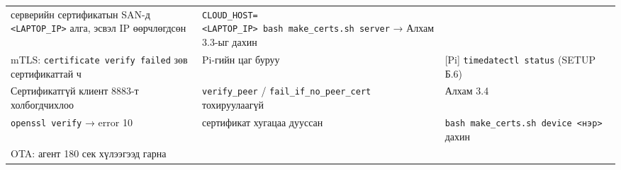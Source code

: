 \begin{longtable}[]{@{}lll@{}}
\begin{minipage}[t]{0.30\columnwidth}
серверийн сертификатын SAN-д \texttt{\textless{}LAPTOP\_\allowbreak{}IP\textgreater{}} алга, эсвэл IP өөрчлөгдсөн\strut
\end{minipage} & \begin{minipage}[t]{0.30\columnwidth}\raggedright
\texttt{CLOUD\_\allowbreak{}HOST=\allowbreak{}\textless{}LAPTOP\_\allowbreak{}IP\textgreater{}\ bash\ make\_\allowbreak{}certs.\allowbreak{}sh\ server} → Алхам 3.3-ыг дахин\strut
\end{minipage}\tabularnewline
\begin{minipage}[t]{0.30\columnwidth}\raggedright
mTLS: \texttt{certificate\ verify\ failed} зөв сертификаттай ч\strut
\end{minipage} & \begin{minipage}[t]{0.30\columnwidth}\raggedright
Pi-гийн цаг буруу\strut
\end{minipage} & \begin{minipage}[t]{0.30\columnwidth}\raggedright
{[}Pi{]} \texttt{timedatectl\ status} (SETUP Б.6)\strut
\end{minipage}\tabularnewline
\begin{minipage}[t]{0.30\columnwidth}\raggedright
Сертификатгүй клиент 8883-т холбогдчихлоо\strut
\end{minipage} & \begin{minipage}[t]{0.30\columnwidth}\raggedright
\texttt{verify\_peer} / \texttt{fail\_\allowbreak{}if\_\allowbreak{}no\_\allowbreak{}peer\_\allowbreak{}cert} тохируулаагүй\strut
\end{minipage} & \begin{minipage}[t]{0.30\columnwidth}\raggedright
Алхам 3.4\strut
\end{minipage}\tabularnewline
\begin{minipage}[t]{0.30\columnwidth}\raggedright
\texttt{openssl\ verify} → error 10\strut
\end{minipage} & \begin{minipage}[t]{0.30\columnwidth}\raggedright
сертификат хугацаа дууссан\strut
\end{minipage} & \begin{minipage}[t]{0.30\columnwidth}\raggedright
\texttt{bash\ make\_\allowbreak{}certs.\allowbreak{}sh\ device\ \textless{}нэр\textgreater{}} дахин\strut
\end{minipage}\tabularnewline
\begin{minipage}[t]{0.30\columnwidth}\raggedright
OTA: агент 180 сек хүлээгээд гарна\strut
\end{minipage} & \begin{minipage}[t]{0.30\columnwidth}\raggedright

\end{minipage}
\end{longtable}
